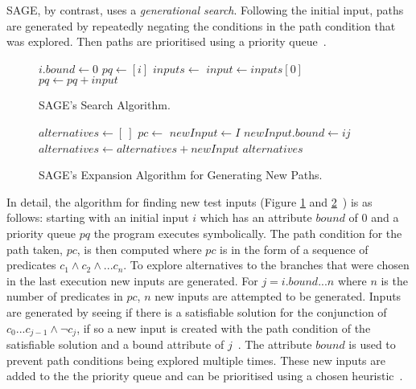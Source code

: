 \documentclass[]{final_report}
\begin{document}
SAGE, by contrast, uses a \textit{generational search}. Following the initial input, paths are generated by repeatedly negating the conditions in the path condition that was explored. Then paths are prioritised using a priority queue~\cite{godefroid2005dart}.

\begin{figure}[t]
\begin{algorithmic}
	\State $i.bound \gets 0$
	\State $pq \gets [i]$
	\State{}
		\State $inputs \gets$ 
			\State $input \gets inputs[0]$
			\State $pq \gets pq + input$
		\EndWhile
	\EndWhile
\EndFunction    
\end{algorithmic}
\caption{\label{fig:sage-search} SAGE's Search Algorithm.}
\end{figure}

\begin{figure}[t]
\begin{algorithmic}
	\State $alternatives \gets [\ ]$
	\State $pc \gets$ 
			\State $newInput \gets I$
			\State $newInput.bound \gets ij$
			\State $alternatives \gets alternatives + newInput$
		\EndIf
	\EndFor
	\State \Return $alternatives$
\EndFunction    
\end{algorithmic}
\caption{\label{fig:sage-compute-new-children} SAGE's Expansion Algorithm for Generating New Paths.}
\end{figure}


In detail, the algorithm for finding new test inputs (Figure \ref{fig:sage-search} and \ref{fig:sage-compute-new-children}~\cite{godefroid2008automated}) is as follows: starting with an initial input $i$ which has an attribute $bound$ of 0 and a priority queue $pq$ the program executes symbolically. The path condition for the path taken, $pc$, is then computed where $pc$ is in the form of a sequence of predicates $c_1 \land c_2 \land ... c_n $. To explore alternatives to the branches that were chosen in the last execution new inputs are generated.  For $j = i.bound ... n$ where $n$ is the number of predicates in $pc$, $n$ new inputs are attempted to be generated. Inputs are generated by seeing if there is a satisfiable solution for the conjunction of $c_0...c_{j-1} \land \lnot{c_j}$, if so a new input is created with the path condition of the satisfiable solution and a bound attribute of $j$~\cite{godefroid2005dart, godefroid2008grammar}. The attribute $bound$ is used to prevent path conditions being explored multiple times. These new inputs are added to the the priority queue and can be prioritised using a chosen heuristic~\cite{cadar2013symbolic}.
\end{document}
